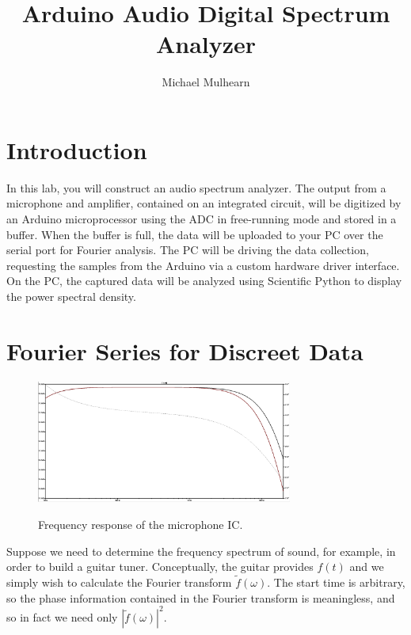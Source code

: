 \documentclass[12pt]{article}
\begin{document}
\title{Arduino Audio Digital Spectrum Analyzer}
\author{Michael Mulhearn}

\maketitle

\section{Introduction}

In this lab, you will construct an audio spectrum analyzer.  The output from a microphone and amplifier, contained on an integrated circuit, will be digitized by an Arduino microprocessor using the ADC in free-running mode and stored in a buffer.  When the buffer is full, the data will be uploaded to your PC over the serial port for Fourier analysis.  The PC will be driving the data collection, requesting the samples from the Arduino via a custom hardware driver interface.  On the PC, the captured data will be analyzed using Scientific Python to display the power spectral density.

\section{Fourier Series for Discreet Data}


\begin{figure}[htbp]
\begin{center}
{\includegraphics[width=0.75\textwidth]{figs/freq.png}}
\end{center}
\caption{\label{fig:freq} Frequency response of the microphone IC.}
\end{figure}

Suppose we need to determine the frequency spectrum of sound, for example, in order to build a guitar tuner.  Conceptually, the guitar provides $f(t)$ and we simply wish to calculate the Fourier transform $\widetilde{f}(\omega)$.  The start time is arbitrary, so the phase information contained in the Fourier transform is meaningless, and so in fact we need only $|\widetilde{f}(\omega)|^2$.
\end{document}
